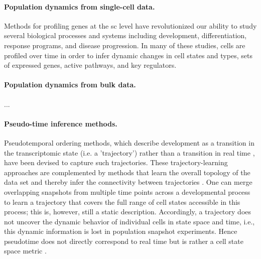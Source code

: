\paragraph{Population dynamics from single-cell data.}

Methods for profiling genes at the \acrlong{sc} level have revolutionized our ability to study several biological processes and systems including development, differentiation, response programs, and disease progression. In many of these studies, cells are profiled over time in order to infer dynamic changes in cell states and types, sets of expressed genes, active pathways, and key regulators.


\citep{fischer2019inferring, busch2015fundamental, hashimoto2016learning, raue2015data2dynamics}

\paragraph{Population dynamics from bulk data.}
...

\paragraph{Pseudo-time inference methods.}
Pseudotemporal ordering methods, which describe development as a transition in the transcriptomic state (i.e. a 'trajectory') rather than a transition in real time \citep{haghverdi2016diffusion, trapnell2014dynamics}, have been devised to capture such trajectories. These trajectory-learning approaches are complemented by methods that learn the overall topology of the data set and thereby infer the connectivity between trajectories \citep{qiu2017reversed, wolf2019paga, saelens2019comparison}. One can merge overlapping snapshots from multiple time points across a developmental process to learn a trajectory that covers the full range of cell states accessible in this process; this is, however, still a static description. Accordingly, a trajectory does not uncover the dynamic behavior of individual cells in state space and time, i.e., this dynamic information is lost in population snapshot experiments. Hence pseudotime does not directly correspond to real time but is rather a cell state space metric \citep{}.

